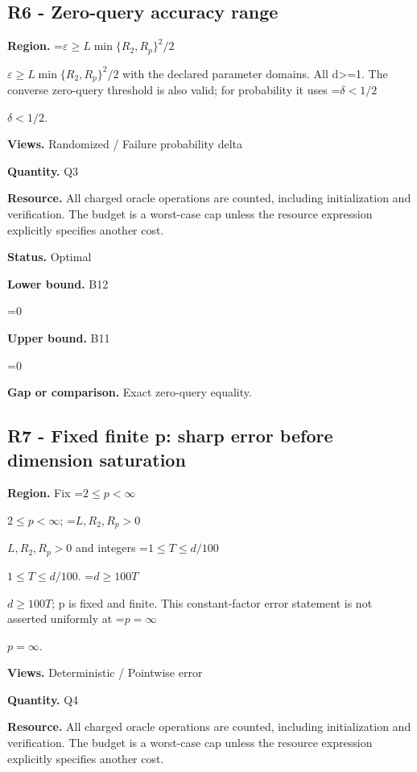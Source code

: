 \documentclass[10pt,a4paper]{article}
\newcommand{\AtlasMath}[1]{\par\begingroup\centering\setbox0=\hbox{$\displaystyle #1$}\ifdim\wd0>1.4\linewidth\typeout{ATLAS WIDE FORMULA: \the\wd0}\fi\ifdim\wd0>\linewidth\resizebox{\linewidth}{!}{\box0}\else\box0\fi\par\endgroup}
\newcommand{\AtlasInlineMath}[1]{\begingroup\setbox0=\hbox{$#1$}\ifdim\wd0>.4\linewidth\endgroup\AtlasMath{#1}\else\endgroup$#1$\fi}
\begin{document}
\subsection{R6 - Zero-query accuracy range}


\textbf{Region.} \AtlasInlineMath{\varepsilon\ge L\min\{R_2,R_p\}^2/2} with the declared parameter domains. All d>=1. The converse zero-query threshold is also valid; for probability it uses \AtlasInlineMath{\delta<1/2}.



\textbf{Views.} Randomized / Failure probability delta



\textbf{Quantity.} Q3



\textbf{Resource.} All charged oracle operations are counted, including initialization and verification. The budget is a worst-case cap unless the resource expression explicitly specifies another cost.



\textbf{Status.} Optimal



\textbf{Lower bound.} B12



\AtlasMath{0}


\textbf{Upper bound.} B11



\AtlasMath{0}


\textbf{Gap or comparison.} Exact zero-query equality.



\subsection{R7 - Fixed finite p: sharp error before dimension saturation}


\textbf{Region.} Fix \AtlasInlineMath{2\le p<\infty}; \AtlasInlineMath{L,R_2,R_p>0} and integers \AtlasInlineMath{1\le T\le d/100}. \AtlasInlineMath{d\ge100T}; p is fixed and finite. This constant-factor error statement is not asserted uniformly at \AtlasInlineMath{p=\infty}.



\textbf{Views.} Deterministic / Pointwise error



\textbf{Quantity.} Q4



\textbf{Resource.} All charged oracle operations are counted, including initialization and verification. The budget is a worst-case cap unless the resource expression explicitly specifies another cost.
\end{document}
